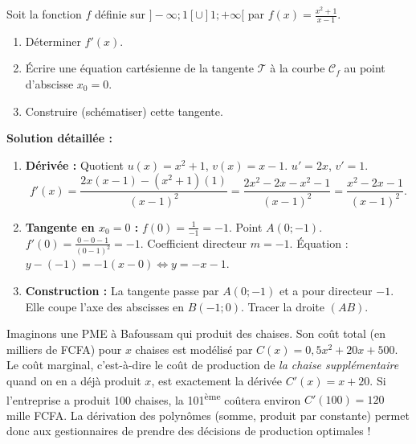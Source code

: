 \documentclass[11pt]{article}
\begin{document}
\begin{exoresolu}
Soit la fonction $f$ définie sur $]-\infty; 1[ \cup ]1; +\infty[$ par $f(x) = \frac{x^2 + 1}{x - 1}$.
\begin{enumerate}
    \item Déterminer $f'(x)$.
    \item Écrire une équation cartésienne de la tangente $\mathcal{T}$ à la courbe $\mathcal{C}_f$ au point d'abscisse $x_0 = 0$.
    \item Construire (schématiser) cette tangente.
\end{enumerate}
\textbf{Solution détaillée :}
\begin{enumerate}
    \item \textbf{Dérivée :} Quotient $u(x)=x^2+1$, $v(x)=x-1$. $u'=2x$, $v'=1$.
    \[ f'(x) = \frac{2x(x-1) - (x^2+1)(1)}{(x-1)^2} = \frac{2x^2 - 2x - x^2 - 1}{(x-1)^2} = \frac{x^2 - 2x - 1}{(x-1)^2}. \]
    \item \textbf{Tangente en $x_0=0$ :}
    $f(0) = \frac{1}{-1} = -1$. Point $A(0; -1)$.
    $f'(0) = \frac{0 - 0 - 1}{(0-1)^2} = -1$. Coefficient directeur $m = -1$.
    Équation : $y - (-1) = -1(x - 0) \iff \boxed{y = -x - 1}$.
    \item \textbf{Construction :} La tangente passe par $A(0;-1)$ et a pour directeur $-1$. Elle coupe l'axe des abscisses en $B(-1;0)$. Tracer la droite $(AB)$.
\end{enumerate}
\end{exoresolu}

\begin{savaistu}
Imaginons une PME à Bafoussam qui produit des chaises. Son coût total (en milliers de FCFA) pour $x$ chaises est modélisé par $C(x) = 0,5x^2 + 20x + 500$.
Le coût marginal, c'est-à-dire le coût de production de \emph{la chaise supplémentaire} quand on en a déjà produit $x$, est exactement la dérivée $C'(x) = x + 20$.
Si l'entreprise a produit 100 chaises, la 101\textsuperscript{ème} coûtera environ $C'(100) = 120$ mille FCFA.
La dérivation des polynômes (somme, produit par constante) permet donc aux gestionnaires de prendre des décisions de production optimales !
\end{savaistu}
\end{document}
